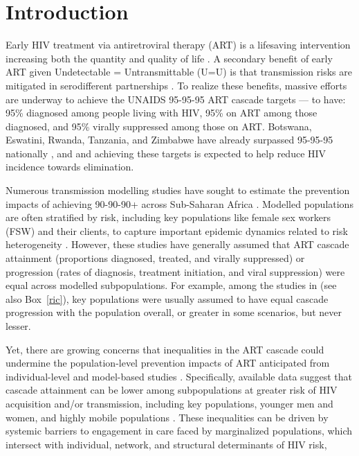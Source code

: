 \section{Introduction}\label{art.intro}
Early HIV treatment via antiretroviral therapy (ART) is a lifesaving intervention
increasing both the quantity and quality of life \cite{Lundgren2015init}.
A secondary benefit of early ART given Undetectable = Untransmittable (U=U) is that
transmission risks are mitigated in serodifferent partnerships \cite{Cohen2016}.
To realize these benefits, massive efforts are underway to achieve
the UNAIDS 95-95-95 ART cascade targets \cite{UNAIDS2023} --- \ie to have:
95\% diagnosed among people living with HIV,
95\% on ART among those diagnosed, and
95\% virally suppressed among those on ART.
Botswana, Eswatini, Rwanda, Tanzania, and Zimbabwe
have already surpassed 95-95-95 nationally \cite{UNAIDS2023}, and
and achieving these targets is expected to help reduce HIV incidence towards elimination.
\par
Numerous transmission modelling studies have sought to estimate
the prevention impacts of achieving 90-90-90+ across Sub-Saharan Africa
\cite{Eaton2012sys,Knight2022sr}.
Modelled populations are often stratified by risk,
including key populations like female sex workers (FSW) and their clients,
to capture important epidemic dynamics related to risk heterogeneity \cite{Watts2010}.
However, these studies have generally assumed that ART cascade
attainment (\ie proportions diagnosed, treated, and virally suppressed) or
progression (\ie rates of diagnosis, treatment initiation, and viral suppression)
were equal across modelled subpopulations.
For example, among the studies in \cite{Knight2022sr} (see also Box~\ref{ric}),
key populations were usually assumed to have
equal cascade progression with the population overall,
or greater in some scenarios, but never lesser.
\par
Yet, there are growing concerns that inequalities in the ART cascade
could undermine the population-level prevention impacts of ART
anticipated from individual-level and model-based studies
\cite{Baral2019,Green2020,Maheu-Giroux2024}.
Specifically, available data suggest that cascade attainment can be lower
among subpopulations at greater risk of HIV acquisition and/or transmission,
including key populations, younger men and women, and highly mobile populations
\cite{Hakim2018,Green2020}.
These inequalities can be driven by
systemic barriers to engagement in care faced by marginalized populations,
which intersect with individual, network, and structural determinants of HIV risk,
